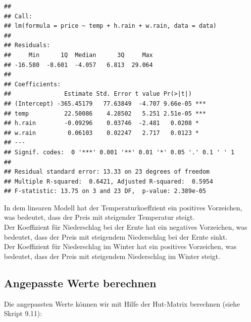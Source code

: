 \documentclass[]{article}
\newenvironment{Shaded}{\begin{snugshade}}{\end{snugshade}}
\newcommand{\DataTypeTok}[1]{\textcolor[rgb]{0.13,0.29,0.53}{#1}}
\newcommand{\DecValTok}[1]{\textcolor[rgb]{0.00,0.00,0.81}{#1}}
\newcommand{\KeywordTok}[1]{\textcolor[rgb]{0.13,0.29,0.53}{\textbf{#1}}}
\newcommand{\NormalTok}[1]{#1}
\newcommand{\OperatorTok}[1]{\textcolor[rgb]{0.81,0.36,0.00}{\textbf{#1}}}
\newcommand{\StringTok}[1]{\textcolor[rgb]{0.31,0.60,0.02}{#1}}
\begin{document}
\begin{verbatim}
## 
## Call:
## lm(formula = price ~ temp + h.rain + w.rain, data = data)
## 
## Residuals:
##     Min      1Q  Median      3Q     Max 
## -16.580  -8.601  -4.057   6.813  29.064 
## 
## Coefficients:
##               Estimate Std. Error t value Pr(>|t|)    
## (Intercept) -365.45179   77.63849  -4.707 9.66e-05 ***
## temp          22.50086    4.28502   5.251 2.51e-05 ***
## h.rain        -0.09296    0.03746  -2.481   0.0208 *  
## w.rain         0.06103    0.02247   2.717   0.0123 *  
## ---
## Signif. codes:  0 '***' 0.001 '**' 0.01 '*' 0.05 '.' 0.1 ' ' 1
## 
## Residual standard error: 13.33 on 23 degrees of freedom
## Multiple R-squared:  0.6421, Adjusted R-squared:  0.5954 
## F-statistic: 13.75 on 3 and 23 DF,  p-value: 2.389e-05
\end{verbatim}

In dem linearen Modell hat der Temperaturkoeffzient ein positives Vorzeichen, was bedeutet,
dass der Preis mit steigender Temperatur steigt.\\
Der Koeffizient für Niederschlag bei der Ernte hat ein negatives Vorzeichen, was bedeutet,
dass der Preis mit steigendem Niederschlag bei der Ernte sinkt.\\
Der Koeffizient für Niederschlag im Winter hat ein positives Vorzeichen, was bedeutet,
dass der Preis mit steigendem Niederschlag im Winter steigt.

\hypertarget{angepasste-werte-berechnen}{%
\subsection{Angepasste Werte berechnen}\label{angepasste-werte-berechnen}}

Die angepassten Werte können wir mit Hilfe der Hut-Matrix berechnen (siehe Skript 9.11):

\begin{Shaded}
\end{Shaded}
\end{document}
